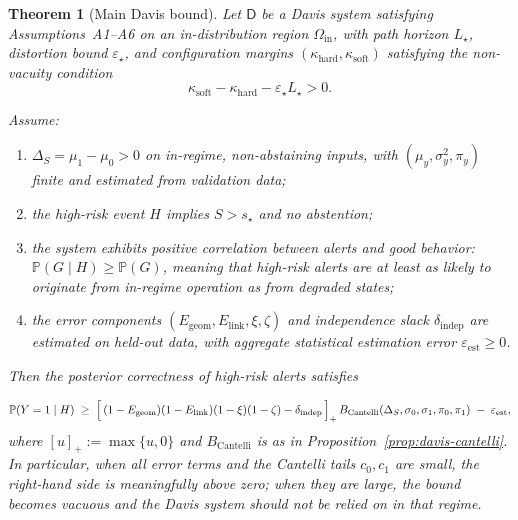 \documentclass[11pt]{article}
\newcommand{\Prob}{\mathbb{P}}
\newtheorem{theorem}{Theorem}
\begin{document}
\begin{theorem}[Main Davis bound]
\label{thm:davis-main}
Let $\mathsf{D}$ be a Davis system satisfying Assumptions~A1–A6 on an in-distribution region
$\Omega_{\mathrm{in}}$, with path horizon $L_\star$, distortion bound $\varepsilon_\star$, and
configuration margins $(\kappa_{\mathrm{hard}}, \kappa_{\mathrm{soft}})$ satisfying the non-vacuity
condition
\[
\kappa_{\mathrm{soft}} - \kappa_{\mathrm{hard}} - \varepsilon_\star L_\star > 0.
\]

Assume:
\begin{enumerate}[label=(\roman*), leftmargin=2em]
  \item $\Delta_S = \mu_1 - \mu_0 > 0$ on in-regime, non-abstaining inputs, with
    $(\mu_y,\sigma_y^2,\pi_y)$ finite and estimated from validation data;
  \item the high-risk event $H$ implies $S > s_\star$ and no abstention;
  \item the system exhibits positive correlation between alerts and good behavior: 
    $\mathbb{P}(G \mid H) \ge \mathbb{P}(G)$, meaning that high-risk alerts are at least as 
    likely to originate from in-regime operation as from degraded states;
  \item the error components $(E_{\mathrm{geom}}, E_{\mathrm{link}}, \xi, \zeta)$ and independence
    slack $\delta_{\mathrm{indep}}$ are estimated on held-out data, with aggregate statistical
    estimation error $\varepsilon_{\mathrm{est}} \ge 0$.
\end{enumerate}

Then the posterior correctness of high-risk alerts satisfies

\begin{equation}
\label{eq:main-davis-bound}
\Prob(Y=1 \mid H)
\;\ge\;
\Bigl[\,(1-E_{\mathrm{geom}})(1-E_{\mathrm{link}})
       (1-\xi)(1-\zeta) - \delta_{\mathrm{indep}}\,\Bigr]_+\,
B_{\mathrm{Cantelli}}(\Delta_S,\sigma_0,\sigma_1,\pi_0,\pi_1)
\;-\; \varepsilon_{\mathrm{est}},
\end{equation}
where $[u]_+ := \max\{u,0\}$ and $B_{\mathrm{Cantelli}}$ is as in
Proposition~\ref{prop:davis-cantelli}. In particular, when all error terms and the Cantelli tails
$c_0,c_1$ are small, the right-hand side is meaningfully above zero; when they are large, the bound
becomes vacuous and the Davis system should not be relied on in that regime.
\end{theorem}
\end{document}
